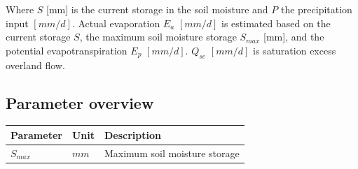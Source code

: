 Where  $S$ [mm] is the current storage in the soil moisture and $P$ the precipitation input $[mm/d]$. Actual evaporation $E_a$ $[mm/d]$ is estimated based on the current storage $S$, the maximum soil moisture storage $S_{max}$ [mm], and the potential evapotranspiration $E_p$ $[mm/d]$. $Q_{se}$ $[mm/d]$ is saturation excess overland flow.

\subsection{Parameter overview}
\begin{table}[htbp]
\centering
    \begin{tabular}{lll}
    \toprule
    Parameter & Unit  & Description \\
    \midrule
    $S_{max}$ & $mm$  & Maximum soil moisture storage \\
    \bottomrule
    \end{tabular}%
  \label{tab:addlabel}%
\end{table}%


